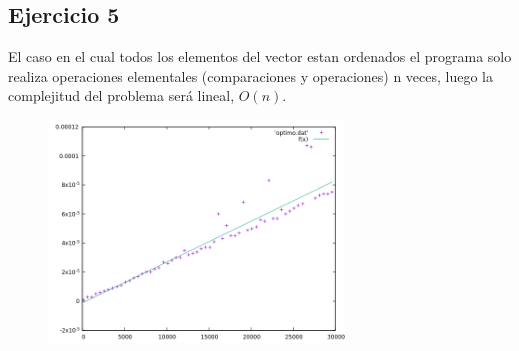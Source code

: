 \subsection*{Ejercicio 5}


\begin{flushleft}
  El caso en el cual todos los elementos del vector estan ordenados el
  programa solo realiza operaciones elementales (comparaciones y
  operaciones) n veces, luego la complejitud del problema será lineal, $O(n)$.

  \begin{figure}[H]
  \centering
    \includegraphics[width=0.7\textwidth]{ejer5/resultado.png}
  \end{figure}
  
\end{flushleft}
